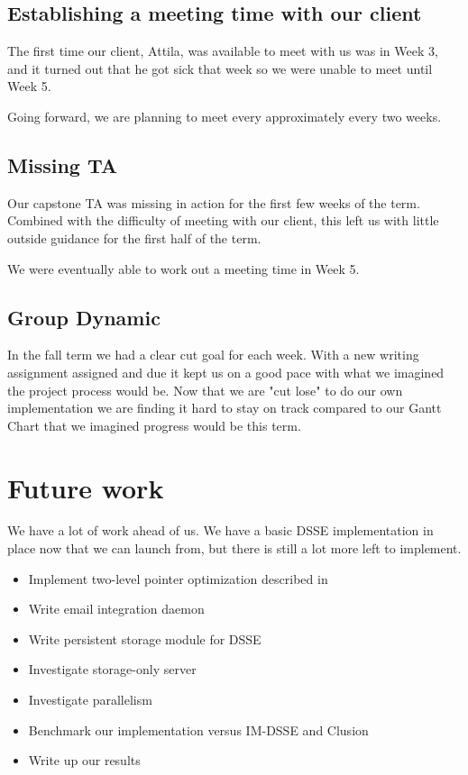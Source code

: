 \documentclass[onecolumn, draftclsnofoot,10pt, compsoc]{IEEEtran}
\begin{document}
\subsection {Establishing a meeting time with our client}
The first time our client, Attila, was available to meet with us was in Week 3, and it turned out that he got sick that week so we were unable to meet until Week 5.

Going forward, we are planning to meet every approximately every two weeks.

\subsection {Missing TA}

Our capstone TA was missing in action for the first few weeks of the term.
Combined with the difficulty of meeting with our client, this left us with little outside guidance for the first half of the term.

We were eventually able to work out a meeting time in Week 5.


\subsection {Group Dynamic}

In the fall term we had a clear cut goal for each week. With a new writing assignment assigned and due it kept us on a good pace with what we imagined the project process would be. Now that we are "cut lose" to do our own implementation we are finding it hard to stay on track compared to our Gantt Chart that we imagined progress would be this term. 

\section {Future work}
We have a lot of work ahead of us. We have a basic DSSE implementation in place now that we can launch from, but there is still a lot more left to implement.

\begin{itemize}
\item Implement two-level pointer optimization described in \cite{cash14}
\item Write email integration daemon
\item Write persistent storage module for DSSE %
\item Investigate storage-only server
\item Investigate parallelism
\item Benchmark our implementation versus IM-DSSE and Clusion
\item Write up our results
\end{itemize}
\end{document}
